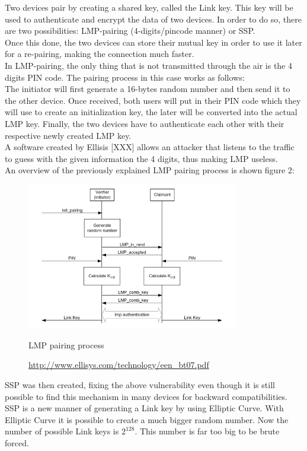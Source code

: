 Two devices pair by creating a shared key, called the Link key. This key will be used to authenticate and encrypt the data of two devices.
In order to do so, there are two possibilities: LMP-pairing (4-digits/pincode manner) or SSP. \\
Once this done, the two devices can store their mutual key in order to use it later for a re-pairing, making the connection much faster.\\
In LMP-pairing, the only thing that is not transmitted through the air is the 4 digits PIN code. The pairing process in this case works as follows: \\
The initiator will first generate a 16-bytes random number and then send it to the other device. Once received, both users will put in their PIN code which they will use to create an initialization key, the later will be converted into the actual LMP key. Finally, the two devices have to authenticate each other with their respective newly created LMP key. \\
A software created by Ellisis [XXX] allows an attacker that listens to the traffic to guess with the given information the 4 digits, thus making LMP useless. \\
An overview of the previously explained LMP pairing process is shown figure 2: 
\begin{figure}[!h]
  \begin{center}
	\includegraphics[width=350px]{images/haha.png}
	\label{LMP pairing}
	\caption{LMP pairing process}
	\caption*{\url{http://www.ellisys.com/technology/een_bt07.pdf}}
  \end{center}
\end{figure}


SSP was then created, fixing the above vulnerability even though it is still possible to find this mechanism in many devices for backward compatibilities. \\
SSP is a new manner of generating a Link key by using Elliptic Curve. With Elliptic Curve it is possible to create a much bigger random number. Now the number of possible Link keys is $2^{128}$. This number is far too big to be brute forced. 


